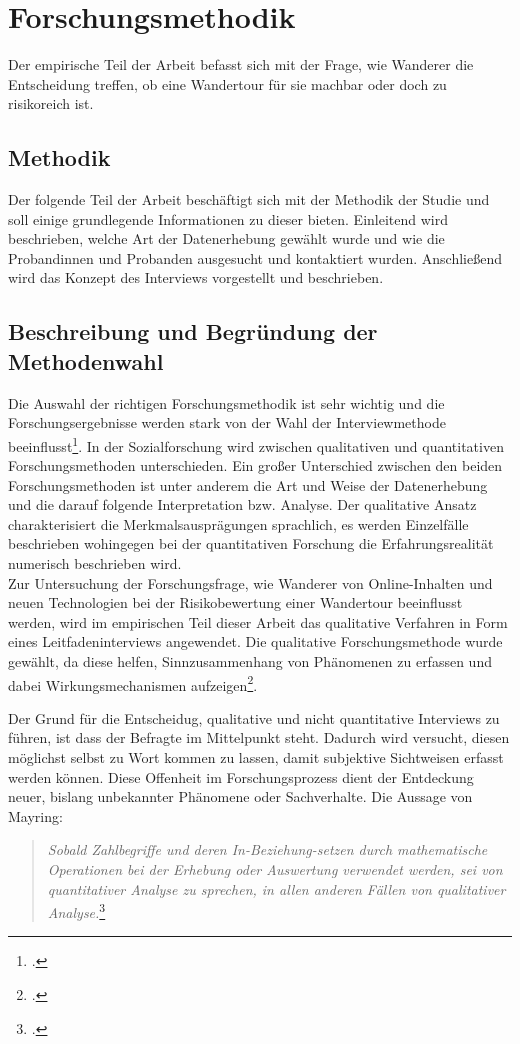 \chapter{Forschungsmethodik}
\label{forschungsmethodik}

Der empirische Teil der Arbeit befasst sich mit der Frage, wie Wanderer die Entscheidung treffen, ob eine Wandertour für sie machbar oder doch zu risikoreich ist.

\section{Methodik}
\label{methodik}

Der folgende Teil der Arbeit beschäftigt sich mit der Methodik der Studie und soll einige grundlegende Informationen zu dieser bieten. Einleitend wird beschrieben, welche Art der Datenerhebung gewählt wurde und wie die Probandinnen und Probanden ausgesucht und kontaktiert wurden. Anschließend wird das Konzept des Interviews vorgestellt und beschrieben.

\section{Beschreibung und Begründung der Methodenwahl}
Die Auswahl der richtigen Forschungsmethodik ist sehr wichtig und die Forschungsergebnisse werden stark von der Wahl der Interviewmethode beeinflusst\footcite[S. 186]{kruse}. 
In der Sozialforschung wird zwischen qualitativen und quantitativen Forschungsmethoden unterschieden. Ein großer Unterschied zwischen den beiden Forschungsmethoden ist unter anderem die Art und Weise der Datenerhebung und die darauf folgende Interpretation bzw. Analyse. Der qualitative Ansatz charakterisiert die Merkmalsausprägungen sprachlich, es werden Einzelfälle beschrieben wohingegen bei der quantitativen Forschung die Erfahrungsrealität numerisch beschrieben wird.\\
Zur Untersuchung der Forschungsfrage, wie Wanderer von Online-Inhalten und neuen Technologien bei der Risikobewertung einer Wandertour beeinflusst werden, wird im empirischen Teil dieser Arbeit das qualitative Verfahren in Form eines Leitfadeninterviews angewendet. Die qualitative Forschungsmethode wurde gewählt, da diese helfen, Sinnzusammenhang von Phänomenen zu erfassen und dabei Wirkungsmechanismen aufzeigen\footcite[S. 117-133]{przyborski}. 

Der Grund für die Entscheidug, qualitative und nicht quantitative Interviews zu führen, ist dass der Befragte im Mittelpunkt steht. Dadurch wird versucht, diesen möglichst selbst zu Wort kommen zu lassen, damit subjektive Sichtweisen erfasst werden können. Diese Offenheit im Forschungsprozess dient der Entdeckung neuer, bislang unbekannter Phänomene oder Sachverhalte. Die Aussage von Mayring:
\begin{quote}
	\textit{ {\glqq Sobald Zahlbegriffe und deren In-Beziehung-setzen durch mathematische Operationen bei der Erhebung oder Auswertung verwendet werden, sei von quantitativer Analyse zu sprechen, in allen anderen Fällen von qualitativer Analyse.\grqq}}\footcite[S. 17]{mayring}
\end{quote}

